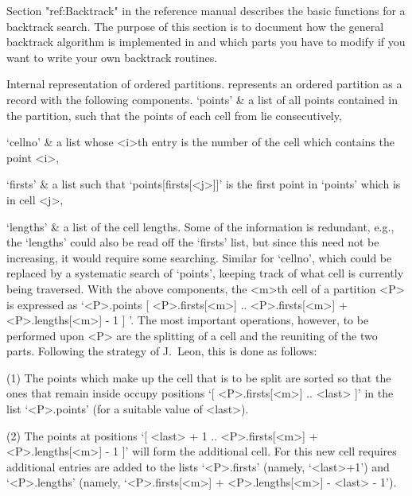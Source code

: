 
\begingroup%
\def\R{{\cal R}} \def\I{{\cal I}}%

Section "ref:Backtrack" in the reference manual describes the basic
functions for a backtrack search. The purpose of
this section  is  to document  how  the general   backtrack algorithm  is
implemented in {\GAP} and which  parts you have to modify  if you want to
write your own backtrack routines.

\medskip
{}
{\bsf Internal   representation  of  ordered   partitions.}\quad   {\GAP}
represents  an  ordered  partition  as  a  record  with   the   following
components.
\beginitems
`points' &
        a list  of all points contained in  the  partition, such that the
        points of each cell from lie consecutively,

`cellno' &
        a list whose <i>th entry is the number of the cell which contains
        the point <i>,

`firsts' &
        a list  such that  `points[firsts[<j>]]'  is  the first point  in
        `points' which is in cell <j>,

`lengths' &
        a list of the  cell lengths.
\enditems
Some of the information is  redundant, e.g., the  `lengths' could also be
read off the `firsts' list,  but since this   need not be increasing,  it
would    require some searching. Similar  for    `cellno', which could be
replaced by a systematic search  of `points', keeping  track of what cell
is currently being  traversed. With the above  components, the <m>th cell
of   a partition <P> is   expressed as `<P>.points{  [ <P>.firsts[<m>] ..
<P>.firsts[<m>] +  <P>.lengths[<m>]  -  1  ]   }'. The   most   important
operations, however, to be performed upon <P> are the splitting of a cell
and the reuniting  of the two parts. Following  the strategy  of J.~Leon,
this is done as follows:

(1) The points which make up the cell that  is to be  split are sorted so
that the ones  that remain inside occupy  positions `[ <P>.firsts[<m>] ..
<last> ]' in the list `<P>.points' (for a suitable value of <last>).

(2) The  points   at positions  `[   <last>  + 1 ..    <P>.firsts[<m>]  +
<P>.lengths[<m>] - 1 ]' will form the  additional cell. For this new cell
requires additional entries are  added to the lists `<P>.firsts' (namely,
`<last>+1')     and    `<P>.lengths'   (namely,      `<P>.firsts[<m>]   +
<P>.lengths[<m>] - <last> - 1').

